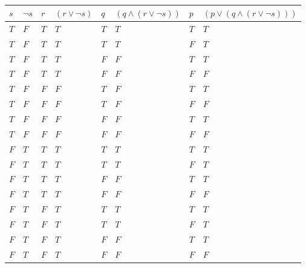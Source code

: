 \documentclass{article}%
\begin{document}
\\
\vspace{4mm}
\begin{tabular}{l | l | l | l | l | l | l | l |}
    $s$ & $\neg s$  & $r$   & $(r \vee \neg s)$ & $q$ & $(q \wedge (r \vee \neg s))$    & $p$ & $(p \vee (q \wedge (r \vee \neg s)))$ \\ \hline
    $T$ & $F$       & $T$   & $T$               & $T$ & $T$                             & $T$ & $T$ \\ \hline
    $T$ & $F$       & $T$   & $T$               & $T$ & $T$                             & $F$ & $T$ \\ \hline
    $T$ & $F$       & $T$   & $T$               & $F$ & $F$                             & $T$ & $T$ \\ \hline
    $T$ & $F$       & $T$   & $T$               & $F$ & $F$                             & $F$ & $F$ \\ \hline
    $T$ & $F$       & $F$   & $F$               & $T$ & $F$                             & $T$ & $T$ \\ \hline
    $T$ & $F$       & $F$   & $F$               & $T$ & $F$                             & $F$ & $F$ \\ \hline
    $T$ & $F$       & $F$   & $F$               & $F$ & $F$                             & $T$ & $T$ \\ \hline
    $T$ & $F$       & $F$   & $F$               & $F$ & $F$                             & $F$ & $F$ \\ \hline
    $F$ & $T$       & $T$   & $T$               & $T$ & $T$                             & $T$ & $T$ \\ \hline
    $F$ & $T$       & $T$   & $T$               & $T$ & $T$                             & $F$ & $T$ \\ \hline
    $F$ & $T$       & $T$   & $T$               & $F$ & $F$                             & $T$ & $T$ \\ \hline
    $F$ & $T$       & $T$   & $T$               & $F$ & $F$                             & $F$ & $F$ \\ \hline
    $F$ & $T$       & $F$   & $T$               & $T$ & $T$                             & $T$ & $T$ \\ \hline
    $F$ & $T$       & $F$   & $T$               & $T$ & $T$                             & $F$ & $T$ \\ \hline
    $F$ & $T$       & $F$   & $T$               & $F$ & $F$                             & $T$ & $T$ \\ \hline
    $F$ & $T$       & $F$   & $T$               & $F$ & $F$                             & $F$ & $F$ \\
    \hline
\end{tabular}\\
\end{document}
